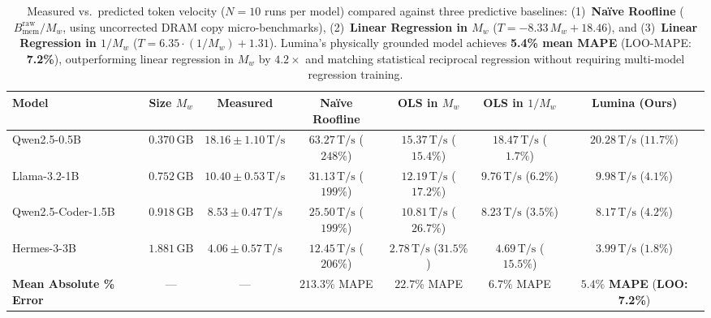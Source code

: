 \documentclass[11pt,a4paper]{article}
\newcommand{\Braw}{B_{\mathrm{mem}}^{\mathrm{raw}}}
\newcommand{\Mw}{M_w}
\newcommand{\Ts}{\,\mathrm{T/s}}
\newcommand{\GB}{\,\mathrm{GB}}
\begin{document}
\begin{table}[h]
\centering
\caption{Measured vs.\ predicted token velocity ($N=10$ runs per model) compared against three predictive baselines: (1)~\textbf{Na\"ive Roofline} ($\Braw/\Mw$, using uncorrected DRAM copy micro-benchmarks), (2)~\textbf{Linear Regression in $\Mw$} ($T = -8.33\,\Mw + 18.46$), and (3)~\textbf{Linear Regression in $1/\Mw$} ($T = 6.35 \cdot (1/\Mw) + 1.31$). Lumina's physically grounded model achieves \textbf{5.4\% mean MAPE} (LOO-MAPE: \textbf{7.2\%}), outperforming linear regression in $\Mw$ by $4.2\times$ and matching statistical reciprocal regression without requiring multi-model regression training.}\label{tab:pred}
\footnotesize
\begin{tabularx}{\linewidth}{@{}>{\raggedright\arraybackslash}p{2.6cm}cCCCCC@{}}
\toprule
\textbf{Model} & \textbf{Size $\Mw$} & \textbf{Measured} & \textbf{Na\"ive Roofline} & \textbf{OLS in $\Mw$} & \textbf{OLS in $1/\Mw$} & \textbf{Lumina (Ours)} \\
\midrule
Qwen2.5-0.5B & $0.370\GB$ & $\mathbf{18.16 \pm 1.10}\Ts$ & $63.27\Ts$ ($248\%$) & $15.37\Ts$ ($15.4\%$) & $18.47\Ts$ ($1.7\%$) & $\mathbf{20.28}\Ts$ ($11.7\%$) \\
Llama-3.2-1B & $0.752\GB$ & $\mathbf{10.40 \pm 0.53}\Ts$ & $31.13\Ts$ ($199\%$) & $12.19\Ts$ ($17.2\%$) & $9.76\Ts$ ($6.2\%$) & $\mathbf{9.98}\Ts$ ($4.1\%$) \\
Qwen2.5-Coder-1.5B & $0.918\GB$ & $\mathbf{8.53 \pm 0.47}\Ts$ & $25.50\Ts$ ($199\%$) & $10.81\Ts$ ($26.7\%$) & $8.23\Ts$ ($3.5\%$) & $\mathbf{8.17}\Ts$ ($4.2\%$) \\
Hermes-3-3B & $1.881\GB$ & $\mathbf{4.06 \pm 0.57}\Ts$ & $12.45\Ts$ ($206\%$) & $2.78\Ts$ ($31.5\%$) & $4.69\Ts$ ($15.5\%$) & $\mathbf{3.99}\Ts$ ($1.8\%$) \\
\midrule
\textbf{Mean Absolute \% Error} & --- & --- & $213.3\%$ MAPE & $22.7\%$ MAPE & $6.7\%$ MAPE & $\mathbf{5.4\%}$ \textbf{MAPE} (\textbf{LOO: 7.2\%}) \\
\bottomrule
\end{tabularx}
\end{table}
\end{document}
